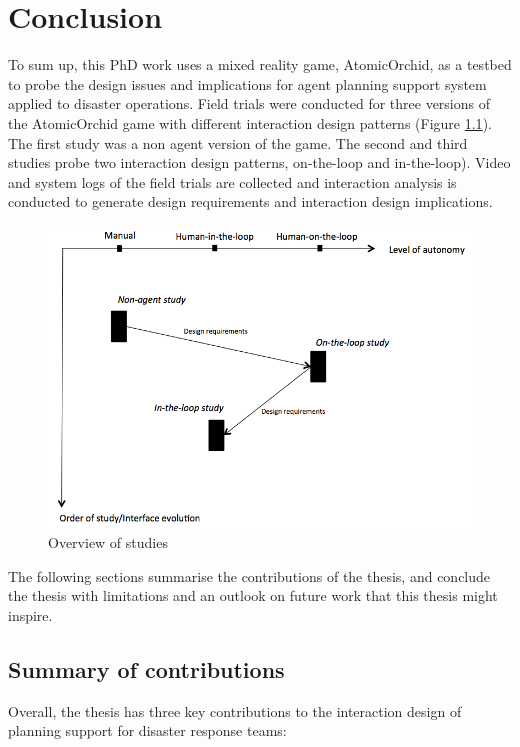 \chapter{Conclusion}\label{ch:conclusion}
To sum up, this PhD work uses a mixed reality game, AtomicOrchid, as a testbed to probe the design issues and implications for agent planning support system applied to disaster operations. Field trials were conducted for three versions of the AtomicOrchid game with different interaction design patterns (Figure \ref{fig:connections}). The first study was a non agent version of the game. The second and third studies probe two interaction design patterns, on-the-loop and in-the-loop). Video and system logs of the field trials are collected and interaction analysis is conducted to generate design requirements and interaction design implications. \\

\begin{figure}[H]
  \centering
  \includegraphics[width=1\textwidth]{img/conclusion/studies}
  \caption{Overview of studies}
  \label{fig:connections}
\end{figure}

The following sections summarise the contributions of the thesis, and conclude the thesis with limitations and an outlook on future work that this thesis might inspire.\\


\section{Summary of contributions}
Overall, the thesis has three key contributions to the interaction design of planning support for disaster response teams:\\

